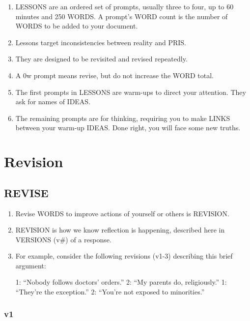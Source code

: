 \documentclass[
]{book}
\providecommand{\tightlist}{%
  \setlength{\itemsep}{0pt}\setlength{\parskip}{0pt}}
\begin{document}
\begin{enumerate}
\def\labelenumi{\arabic{enumi}.}
\setcounter{enumi}{18}
\tightlist
\item
  LESSONS are an ordered set of prompts, usually three to four, up to 60 minutes and 250 WORDS.
  A prompt's WORD count is the number of
  WORDS to be added to your document.
\item
  Lessons target inconsistencies between reality and PRIS.
\item
  They are designed to be revisited and revised repeatedly.
\item
  A 0w prompt means revise, but do not increase the WORD total.
\item
  The first prompts in LESSONS are warm-ups to direct your attention.
  They ask for names of IDEAS.
\item
  The remaining prompts are for thinking, requiring you to make LINKS
  between your warm-up IDEAS. Done right, you will face some new
  truths.
\end{enumerate}

\hypertarget{revision}{%
\section{Revision}\label{revision}}

\hypertarget{revise}{%
\subsection{REVISE}\label{revise}}

\begin{enumerate}
\def\labelenumi{\arabic{enumi}.}
\setcounter{enumi}{24}
\item
  Revise WORDS to improve actions of yourself or others is REVISION.
\item
  REVISION is how we know reflection is happening, described here in VERSIONS (v\#) of a response.
\item
  For example, consider the following revisions (v1-3) describing this
  brief argument:

  1: ``Nobody follows doctors' orders.''
  2: ``My parents do, religiously.''
  1: ``They're the exception.''
  2: ``You're not exposed to minorities.''
\end{enumerate}

\hypertarget{v1}{%
\subsubsection{v1}\label{v1}}
\end{document}
